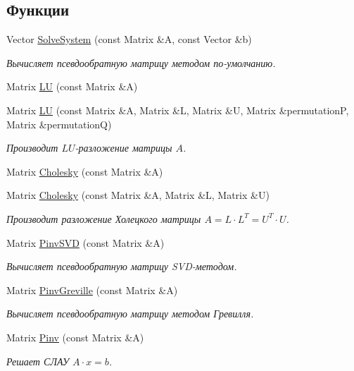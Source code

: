 \subsection*{Функции}
\begin{DoxyCompactItemize}
\item 
Vector \hyperlink{namespace_math_1_1_lin_alg_ab6e559246eac7fcd1bb0ef18fc4657ee}{Solve\+System} (const Matrix \&A, const Vector \&b)
\begin{DoxyCompactList}\small\item\em Вычисляет псевдообратную матрицу методом по-\/умолчанию. \end{DoxyCompactList}\item 
Matrix \hyperlink{namespace_math_1_1_lin_alg_ad6053d7dea0e4d128cdcff0d8423708a}{LU} (const Matrix \&A)
\item 
Matrix \hyperlink{namespace_math_1_1_lin_alg_ad84a3dd8b243ffbc96f777aebafcbd8f}{LU} (const Matrix \&A, Matrix \&L, Matrix \&U, Matrix \&permutationP, Matrix \&permutationQ)
\begin{DoxyCompactList}\small\item\em Производит $LU$-\/разложение матрицы $A$. \end{DoxyCompactList}\item 
Matrix \hyperlink{namespace_math_1_1_lin_alg_a63d9cc41c4735dc5cefd2ec8880f432c}{Cholesky} (const Matrix \&A)
\item 
Matrix \hyperlink{namespace_math_1_1_lin_alg_a980590dcd2dcd5557b299e7b5dfc1946}{Cholesky} (const Matrix \&A, Matrix \&L, Matrix \&U)
\begin{DoxyCompactList}\small\item\em Производит разложение Холецкого матрицы $A = L \cdot L^{T} = U^{T} \cdot U$. \end{DoxyCompactList}\item 
Matrix \hyperlink{namespace_math_1_1_lin_alg_adaef1c5da9ab98ab6e106086383e3ed6}{Pinv\+S\+VD} (const Matrix \&A)
\begin{DoxyCompactList}\small\item\em Вычисляет псевдообратную матрицу S\+V\+D-\/методом. \end{DoxyCompactList}\item 
Matrix \hyperlink{namespace_math_1_1_lin_alg_a03abc1453c96f7898d89262f5278aefc}{Pinv\+Greville} (const Matrix \&A)
\begin{DoxyCompactList}\small\item\em Вычисляет псевдообратную матрицу методом Гревилля. \end{DoxyCompactList}\item 
Matrix \hyperlink{namespace_math_1_1_lin_alg_ab41fd1a41bd477364edce9085e8d6ac0}{Pinv} (const Matrix \&A)
\begin{DoxyCompactList}\small\item\em Решает СЛАУ $ A \cdot x = b$. \end{DoxyCompactList}\end{DoxyCompactItemize}


